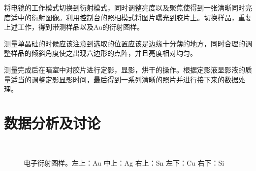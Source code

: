 \documentclass[aps,pre,12pt,preprint,onecolumn,showpacs,showkeys,UTF8]{revtex4-1}
\begin{document}
将电镜的工作模式切换到衍射模式，同时调整亮度以及聚焦使得到一张清晰同时亮度适中的衍射图像。利用控制台的照相模式将图片曝光到胶片上。切换样品，重复上述工作，得到带测样品以及Au的衍射图样。

测量单晶硅的时候应该注意到选取的位置应该是边缘十分薄的地方，同时合理的调整样品的倾斜角度使之出现六边形的点阵，并且亮度相对均匀。

测量完成后在暗室中对胶片进行定影，显影，烘干的操作。根据定影液显影液的质量适当的调整定影显影时间，最后得到一系列清晰的照片并进行接下来的数据处理。

\section{数据分析及讨论}

\begin{figure}[h]
	\begin{center}
		\\
		\caption{\label{fig:exp1}电子衍射图样。左上：Au 中上：Ag 右上：Sn 左下：Cu 右下：Si}
	\end{center}
\end{figure}
\end{document}
